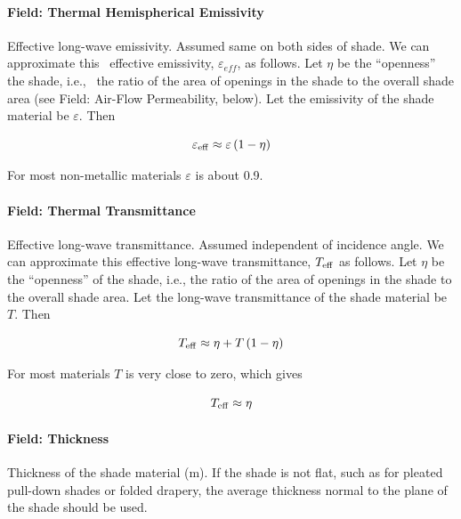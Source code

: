 \paragraph{Field: Thermal Hemispherical Emissivity}\label{field-thermal-hemispherical-emissivity}

Effective long-wave emissivity. Assumed same on both sides of shade. We can approximate this~ effective emissivity, \(\varepsilon_{eff}\), as follows. Let \(\eta\) be the ``openness'' the shade, i.e.,~ the ratio of the area of openings in the shade to the overall shade area (see Field: Air-Flow Permeability, below). Let the emissivity of the shade material be \(\varepsilon\). Then

\begin{equation}
{\varepsilon_{{\rm{eff}}}} \approx \varepsilon \left( {1 - \eta } \right)
\end{equation}

For most non-metallic materials \(\varepsilon\) is about 0.9.

\paragraph{Field: Thermal Transmittance}\label{field-thermal-transmittance}

Effective long-wave transmittance. Assumed independent of incidence angle. We can approximate this effective long-wave transmittance, \(T_{\rm{eff}}\) as follows. Let \(\eta\) be the ``openness'' of the shade, i.e., the ratio of the area of openings in the shade to the overall shade area. Let the long-wave transmittance of the shade material be \(T\). Then

\begin{equation}
T_{\rm{eff}} \approx \eta + T \left( 1 - \eta \right)
\end{equation}

For most materials \(T\) is very close to zero, which gives

\begin{equation}
T_{\rm{eff}} \approx \eta
\end{equation}

\paragraph{Field: Thickness}\label{field-thickness-6}

Thickness of the shade material (m). If the shade is not flat, such as for pleated pull-down shades or folded drapery, the average thickness normal to the plane of the shade should be used.

